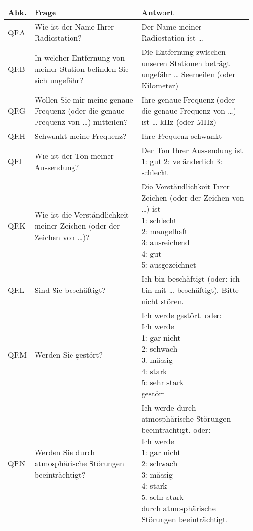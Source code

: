{
\setlength{\belowrulesep}{1pt}
\setlength{\aboverulesep}{1pt}
\newcommand{\wrap}[1]{\begin{minipage}[t]{5.5cm}#1\end{minipage}}
\begin{longtabu} to 
\rowfont \bfseries Abk. & Frage & Antwort \\
\toprule
\endhead
{}
QRA & Wie ist der Name Ihrer Radiostation? & Der Name meiner Radiostation ist … \\  \midrule
QRB & In welcher Entfernung von meiner Station befinden Sie sich ungefähr? & Die Entfernung zwischen unseren Stationen beträgt ungefähr … Seemeilen (oder Kilometer) \\ \midrule
QRG & Wollen Sie mir meine genaue Frequenz (oder die genaue Frequenz von …) mitteilen? & Ihre genaue Frequenz (oder die genaue Frequenz von …) ist … kHz (oder MHz) \\ \midrule
QRH & Schwankt meine Frequenz? & Ihre Frequenz schwankt \\ \midrule
QRI & Wie ist der Ton meiner Aussendung? & Der Ton Ihrer Aussendung ist 1: gut 2: veränderlich 3: schlecht \\ \midrule
QRK & Wie ist die Verständlichkeit meiner Zeichen (oder der Zeichen von …)? & \wrap{Die Verständlichkeit Ihrer Zeichen (oder der Zeichen von …) ist\\ 1: schlecht\\ 2: mangelhaft\\ 3: ausreichend\\ 4: gut\\ 5: ausgezeichnet} \\ \midrule
QRL & Sind Sie beschäftigt? & Ich bin beschäftigt (oder: ich bin mit … beschäftigt). Bitte nicht stören. \\ \midrule
QRM & Werden Sie gestört? & \wrap{Ich werde gestört. oder:\\ Ich werde\\ 1: gar nicht\\ 2: schwach\\ 3: mässig\\ 4: stark\\ 5: sehr stark\\ gestört} \\ \midrule
QRN & Werden Sie durch atmosphärische Störungen beeinträchtigt? & \wrap{Ich werde durch atmosphärische Störungen beeinträchtigt. oder:\\ Ich werde\\ 1: gar nicht \\ 2: schwach\\ 3: mässig\\ 4: stark\\ 5: sehr stark\\ durch atmosphärische Störungen beeinträchtigt.} \\ \midrule

\end{longtabu}}
